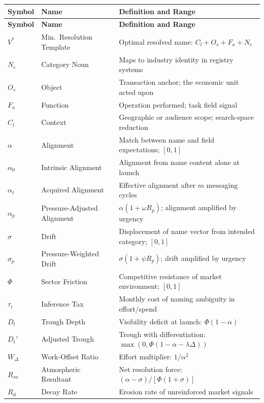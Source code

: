 \documentclass[12pt, openany]{book}
\theoremstyle{thmstyle}
\theoremstyle{defstyle}
\newcommand{\taui}{\tau_i}
\begin{document}
\begin{longtable}{@{}p{1.0in} p{1.3in} p{3.5in}@{}}
\toprule
\textbf{Symbol} & \textbf{Name} & \textbf{Definition and Range} \\
\midrule
\endfirsthead
\toprule
\textbf{Symbol} & \textbf{Name} & \textbf{Definition and Range} \\
\midrule
\endhead
\bottomrule
\endlastfoot
$V^*$ & Min.\ Resolution Template & Optimal resolved name: $C_l + O_s + F_a + N_c$ \\[3pt]
$N_c$ & Category Noun & Maps to industry identity in registry systems \\[3pt]
$O_s$ & Object & Transaction anchor; the economic unit acted upon \\[3pt]
$F_a$ & Function & Operation performed; task field signal \\[3pt]
$C_l$ & Context & Geographic or audience scope; search-space reduction \\[3pt]
$\alpha$ & Alignment & Match between name and field expectations; $[0,1]$ \\[3pt]
$\alpha_0$ & Intrinsic Alignment & Alignment from name content alone at launch \\[3pt]
$\alpha_t$ & Acquired Alignment & Effective alignment after $m$ messaging cycles \\[3pt]
$\alpha_p$ & Pressure-Adjusted Alignment & $\alpha(1+\omega R_p)$; alignment amplified by urgency \\[3pt]
$\sigma$ & Drift & Displacement of name vector from intended category; $[0,1]$ \\[3pt]
$\sigma_p$ & Pressure-Weighted Drift & $\sigma(1+\psi R_p)$; drift amplified by urgency \\[3pt]
$\Phi$ & Sector Friction & Competitive resistance of market environment; $[0,1]$ \\[3pt]
$\taui$ & Inference Tax & Monthly cost of naming ambiguity in effort/spend \\[3pt]
$D_t$ & Trough Depth & Visibility deficit at launch: $\Phi(1-\alpha)$ \\[3pt]
$D_t'$ & Adjusted Trough & Trough with differentiation: $\max(0, \Phi(1-\alpha-\lambda\Delta))$ \\[3pt]
$W_\Delta$ & Work-Offset Ratio & Effort multiplier: $1/\alpha^2$ \\[3pt]
$R_{sn}$ & Atmospheric Resultant & Net resolution force: $(\alpha-\sigma)/[\Phi(1+\sigma)]$ \\[3pt]
$R_d$ & Decay Rate & Erosion rate of unreinforced market signals \\[3pt]

\end{longtable}
\end{document}
